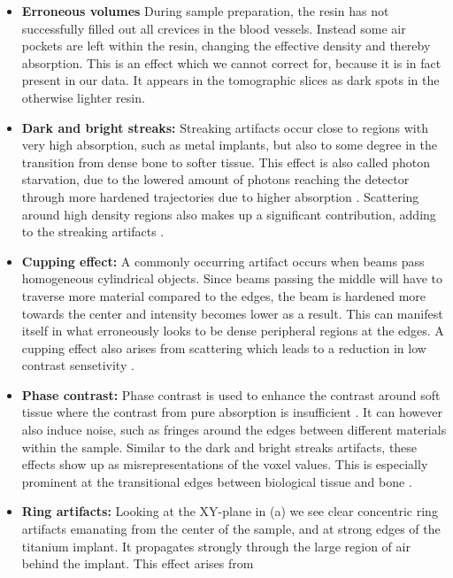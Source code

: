 \begin{itemize}
  \item \textbf{Erroneous volumes} During sample preparation, the resin has not
	successfully filled out all crevices in the blood vessels. Instead
	some air pockets are left within the resin, changing the
	effective density and thereby absorption. This is an effect
	which we cannot correct for, because it is in fact present in
	our data. It appears in the tomographic slices
	 as dark spots in the otherwise lighter resin. 
  \item \textbf{Dark and bright streaks:} Streaking artifacts occur close to
	regions with very high absorption, such as metal implants, but also
	to some degree in the transition from dense bone to softer
	tissue.  This effect is also called photon starvation, due to
	the lowered amount of photons reaching the detector through
	more hardened trajectories due to higher absorption
	\citep{srnoise}. Scattering around high density regions also
	makes up a significant contribution, adding to the streaking
	artifacts \citep{scatter_sr_ct}.
  \item \textbf{Cupping effect:} A commonly occurring artifact occurs when
	beams pass homogeneous cylindrical objects. Since beams passing the
	middle will have to traverse more material compared to the
	edges, the beam is hardened more towards the center and
	intensity becomes lower as a result. This can manifest itself
	in what erroneously looks to be dense peripheral regions at the
	edges. A cupping effect also arises from scattering which leads
	to a reduction in low contrast sensetivity \citep{sr_streak_artifact_scatter}.
  \item \textbf{Phase contrast:} Phase contrast is used to enhance the contrast
	around soft tissue where the contrast from pure absorption is
	insufficient \citep{phasecontrast}. It can however also induce
	noise, such as fringes around the edges between different
	materials within the sample\citep{srnoise}. Similar to the dark
	and bright streaks artifacts, these effects show up as
	misrepresentations of the voxel values. This is especially
	prominent at the transitional edges between biological tissue
	and bone \citep{sr_streak_artifacts_scatter}.
  \item \textbf{Ring artifacts:} Looking at the XY-plane in
	 (a) we see clear concentric ring artifacts emanating
	from the center of the sample, and at strong edges of the
	titanium implant. It propagates strongly through the large
	region of air behind the implant. This effect arises from

\end{itemize}

